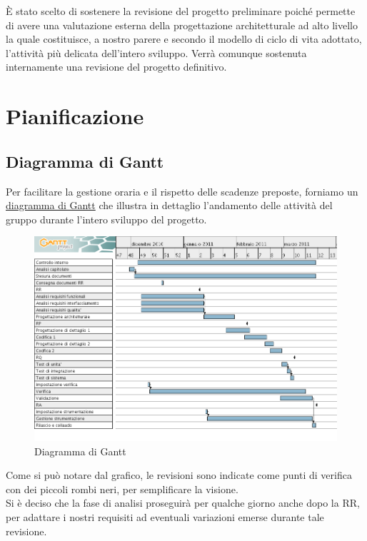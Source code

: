 \`E stato scelto di sostenere la revisione del progetto preliminare poich\'e
permette di avere una valutazione esterna della progettazione architetturale ad
alto livello la quale costituisce, a nostro parere e secondo il modello di ciclo
di vita adottato, l'attivit\`a pi\`u delicata dell'intero sviluppo.
Verr\`a comunque sostenuta internamente una revisione del progetto definitivo.

\chapter{Pianificazione}
\thispagestyle{fancy}

\section{Diagramma di Gantt}
Per facilitare la gestione oraria e il rispetto delle scadenze preposte,
forniamo un \underline{diagramma di Gantt} che illustra in dettaglio l'andamento
delle attivit\`a del gruppo durante l'intero sviluppo del progetto.
\vspace{0.8cm}
\begin{figure}[htbp]
  \centering
  \includegraphics[width=17.2cm, angle=0]{img/PP/gantt1.png}
\caption{Diagramma di Gantt}
\end{figure}
\newpage

Come si pu\`o notare dal grafico, le revisioni sono indicate come punti di 
verifica con dei piccoli rombi neri, per semplificare la visione.\\
Si \`e deciso che la fase di analisi proseguir\`a per qualche giorno anche dopo
la RR, per adattare i nostri requisiti ad eventuali variazioni emerse durante
tale revisione.\\

